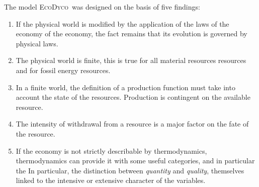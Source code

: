 \documentclass[12pt,a4paper]{article}%
\newcommand{\ed}{\textsc{EcoDyco}}
\begin{document}
%
%
%
%
%

The model \ed\ was designed on the basis of five findings:

\begin{enumerate}
	\item If the physical world is modified by the application of the laws of the economy
	of the economy, the fact remains that its evolution is governed by
	physical laws.
	
	\item The physical world is finite, this is true for all material resources
	resources and for fossil energy resources.
	
	\item In a finite world, the definition of a production function must take into account the state of the resources. Production is contingent on the available resource.
	
	\item The intensity of withdrawal from a resource is a major factor
	on the fate of the resource.
	
	\item If the economy is not strictly describable by thermodynamics,
	thermodynamics can provide it with some useful categories, and in particular the
	In particular, the distinction between \textit{quantity} and \textit{quality},
	themselves linked to the intensive or extensive character of the variables.
\end{enumerate}
\end{document}
